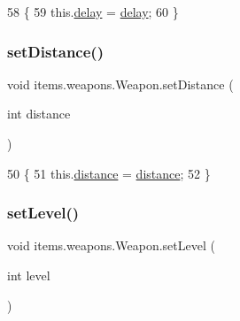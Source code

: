 \begin{DoxyCode}
58                                     \{
59         this.\mbox{\hyperlink{classitems_1_1weapons_1_1_weapon_acf51fcf734c1ce98cbc6d1c2912e8058}{delay}} = \mbox{\hyperlink{classitems_1_1weapons_1_1_weapon_acf51fcf734c1ce98cbc6d1c2912e8058}{delay}};
60     \}
\end{DoxyCode}
\mbox{\label{classitems_1_1weapons_1_1_weapon_a051f07bce12bb2aeec2d7f1f7c5a03e5}} 
\subsubsection{\texorpdfstring{set\+Distance()}{setDistance()}}
{\footnotesize\ttfamily void items.\+weapons.\+Weapon.\+set\+Distance (\begin{DoxyParamCaption}\item[{int}]{distance }\end{DoxyParamCaption})\hspace{0.3cm}{\ttfamily [inline]}}


\begin{DoxyCode}
50                                           \{
51         this.\mbox{\hyperlink{classitems_1_1weapons_1_1_weapon_a125dc77704bbb1758d35f282802dcb8d}{distance}} = \mbox{\hyperlink{classitems_1_1weapons_1_1_weapon_a125dc77704bbb1758d35f282802dcb8d}{distance}};
52     \}
\end{DoxyCode}
\mbox{\label{classitems_1_1weapons_1_1_weapon_adaf7cf7bef079e47d814aa0350b691ba}} 
\subsubsection{\texorpdfstring{set\+Level()}{setLevel()}}
{\footnotesize\ttfamily void items.\+weapons.\+Weapon.\+set\+Level (\begin{DoxyParamCaption}\item[{int}]{level }\end{DoxyParamCaption})\hspace{0.3cm}{\ttfamily [inline]}}


